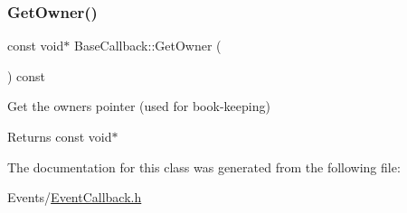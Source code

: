 \mbox{\label{classBaseCallback_ad9ea4e795a92a1c91b38596dbca29da3}} 
\subsubsection{\texorpdfstring{Get\+Owner()}{GetOwner()}}
{\footnotesize\ttfamily const void$\ast$ Base\+Callback\+::\+Get\+Owner (\begin{DoxyParamCaption}{ }\end{DoxyParamCaption}) const\hspace{0.3cm}{\ttfamily [inline]}}



Get the owner\textquotesingle{}s pointer (used for book-\/keeping) 

\begin{DoxyReturn}{Returns}
const void$\ast$ 
\end{DoxyReturn}


The documentation for this class was generated from the following file\+:\begin{DoxyCompactItemize}
\item 
Events/\hyperlink{EventCallback_8h}{Event\+Callback.\+h}\end{DoxyCompactItemize}
